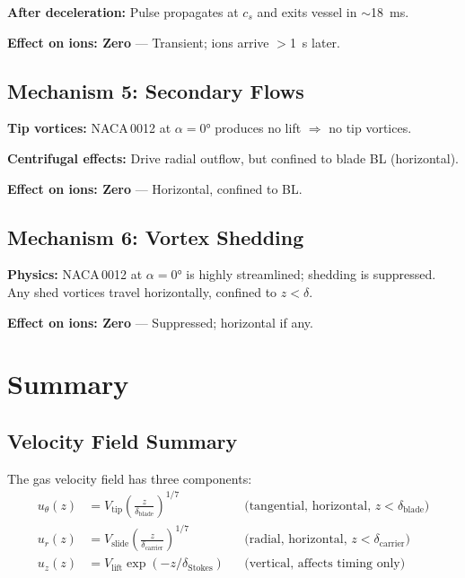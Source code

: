 \documentclass[11pt,a4paper]{article}
\begin{document}
\textbf{After deceleration:} Pulse propagates at $c_s$ and exits vessel in $\sim$18~ms.

\textbf{Effect on ions: Zero} --- Transient; ions arrive $>$1~s later.

\subsection{Mechanism 5: Secondary Flows}

\textbf{Tip vortices:} NACA\,0012 at $\alpha = 0°$ produces no lift $\Rightarrow$
no tip vortices.

\textbf{Centrifugal effects:} Drive radial outflow, but confined to blade BL (horizontal).

\textbf{Effect on ions: Zero} --- Horizontal, confined to BL.

\subsection{Mechanism 6: Vortex Shedding}

\textbf{Physics:} NACA\,0012 at $\alpha = 0°$ is highly streamlined; shedding
is suppressed. Any shed vortices travel horizontally, confined to $z < \delta$.

\textbf{Effect on ions: Zero} --- Suppressed; horizontal if any.


\section{Summary}
\label{sec:summary}

\subsection{Velocity Field Summary}

The gas velocity field has three components:
\begin{align}
  u_\theta(z) &= V_\mathrm{tip} \left(\frac{z}{\delta_\mathrm{blade}}\right)^{1/7}
    && \text{(tangential, horizontal, } z < \delta_\mathrm{blade}\text{)} \\
  u_r(z) &= V_\mathrm{slide} \left(\frac{z}{\delta_\mathrm{carrier}}\right)^{1/7}
    && \text{(radial, horizontal, } z < \delta_\mathrm{carrier}\text{)} \\
  u_z(z) &= V_\mathrm{lift} \exp(-z/\delta_\mathrm{Stokes})
    && \text{(vertical, affects timing only)}
\end{align}
\end{document}
